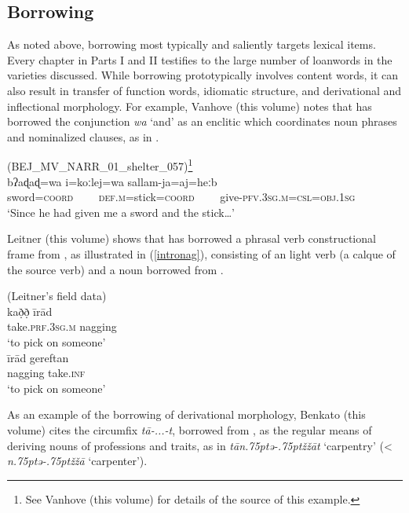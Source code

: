 \documentclass[output=paper]{langsci/langscibook}
\begin{document}
\subsection{Borrowing}\label{introborrowing}

As noted above, borrowing most typically and saliently targets lexical items. Every chapter in Parts I and II testifies to the large number of {loanwords} in the varieties discussed. While borrowing prototypically involves content words, it can also result in {transfer} of function words, {idiomatic} structure, and {derivational} and {inflectional} morphology. For example, Vanhove (this volume) notes that  has borrowed the  conjunction \textit{wa} `and' as an enclitic which coordinates noun phrases and nominalized clauses, as in .

\ea \label{introsword}
{ (BEJ\_MV\_NARR\_01\_shelter\_057)\footnote{See Vanhove (this volume) for details of the source of this example.}}\\
\gll bʔaɖaɖ=wa i=koːlej=wa sallam-ja=aj=heːb\\
     sword=\textsc{coord}~~~~ \textsc{def.m}=stick=\textsc{coord}~~~~ give-\textsc{pfv.3sg.m=csl=obj.1sg}\\
\glt `Since he had given me a sword and the stick…'
\z


Leitner (this volume) shows that   has borrowed a phrasal verb constructional frame from , as illustrated in (\ref{intronag}), consisting of an  {light verb} (a {calque} of the  source verb) and a noun borrowed from .


\ea \label{intronag}
\ea {}  (Leitner's field data)\\
\gll kað̣ð̣ īrād\\
     take.\textsc{prf}.3\textsc{sg}.\textsc{m} nagging\\
\glt ‘to pick on someone’
\\
\gll īrād gereftan\\
     nagging take.\textsc{inf}\\
\glt ‘to pick on someone’
\z
\z


As an example of the borrowing of {derivational} morphology, Benkato (this volume) cites the   circumfix \textit{tā-...-t}, borrowed from , as the regular means of deriving nouns of professions and traits, as in \textit{tān\kern .75ptǝ\kern -.75ptžžā{\R}t} ‘carpentry’ (< \textit{n\kern .75ptǝ\kern -.75ptžžā\R} `carpenter').
\end{document}
